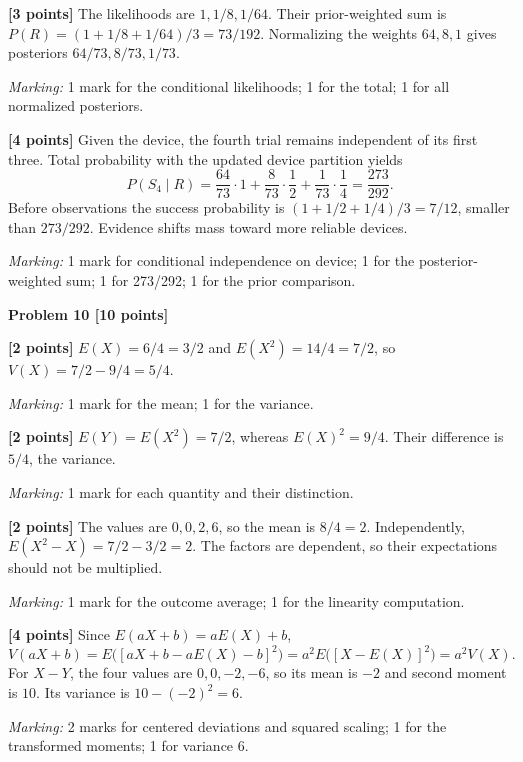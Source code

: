 \documentclass[12pt,letterpaper]{article}
\newcommand{\problemheading}[2][5\baselineskip]{\Needspace{#1}\par\noindent\hspace*{-0.625in}\textbf{#2}\par\nobreak\vspace{0.3em}}
\begin{document}
\begin{description}[font=\normalfont,leftmargin=1.2em,labelsep=0.4em]
\item[(a)] \textbf{[3 points]} The likelihoods are $1,1/8,1/64$. Their prior-weighted sum is $P(R)=(1+1/8+1/64)/3=73/192$. Normalizing the weights $64,8,1$ gives posteriors $64/73,8/73,1/73$.
\par\textit{Marking:} 1 mark for the conditional likelihoods; 1 for the total; 1 for all normalized posteriors.
\item[(b)] \textbf{[4 points]} Given the device, the fourth trial remains independent of its first three. Total probability with the updated device partition yields\[P(S_4\mid R)=\frac{64}{73}\cdot1+\frac8{73}\cdot\frac12+\frac1{73}\cdot\frac14=\frac{273}{292}.\]Before observations the success probability is $(1+1/2+1/4)/3=7/12$, smaller than $273/292$. Evidence shifts mass toward more reliable devices.
\par\textit{Marking:} 1 mark for conditional independence on device; 1 for the posterior-weighted sum; 1 for 273/292; 1 for the prior comparison.
\end{description}
\vspace{0.65em}
\problemheading[\dimexpr 3\baselineskip+4\baselineskip\relax]{Problem 10 [10 points]}
\begin{description}[font=\normalfont,leftmargin=1.2em,labelsep=0.4em]
\item[(a)] \textbf{[2 points]} $E(X)=6/4=3/2$ and $E(X^2)=14/4=7/2$, so $V(X)=7/2-9/4=5/4$.
\par\textit{Marking:} 1 mark for the mean; 1 for the variance.
\item[(b)] \textbf{[2 points]} $E(Y)=E(X^2)=7/2$, whereas $E(X)^2=9/4$. Their difference is $5/4$, the variance.
\par\textit{Marking:} 1 mark for each quantity and their distinction.
\item[(c)] \textbf{[2 points]} The values are $0,0,2,6$, so the mean is $8/4=2$. Independently, $E(X^2-X)=7/2-3/2=2$. The factors are dependent, so their expectations should not be multiplied.
\par\textit{Marking:} 1 mark for the outcome average; 1 for the linearity computation.
\item[(d)] \textbf{[4 points]} Since $E(aX+b)=aE(X)+b$,\[V(aX+b)=E\bigl([aX+b-aE(X)-b]^2\bigr)=a^2E\bigl([X-E(X)]^2\bigr)=a^2V(X).\]For $X-Y$, the four values are $0,0,-2,-6$, so its mean is $-2$ and second moment is $10$. Its variance is $10-(-2)^2=6$.
\par\textit{Marking:} 2 marks for centered deviations and squared scaling; 1 for the transformed moments; 1 for variance 6.
\end{description}
\end{document}
